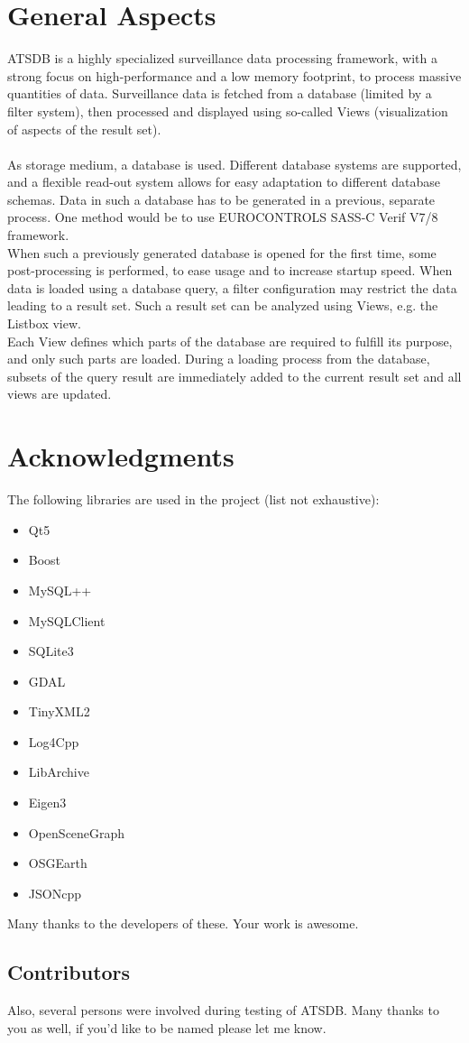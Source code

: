 \section{General Aspects}
ATSDB is a highly specialized surveillance data processing framework, with a strong focus on high-performance and a low memory footprint,  to process massive quantities of data. Surveillance data is fetched from a database (limited by a filter system), then processed and displayed using so-called Views (visualization of aspects of the result set).\\\\

As storage medium, a database is used.  Different database systems are supported, and a flexible read-out system allows for easy adaptation to different database schemas.  Data in such a database has to be generated in a previous, separate process.  One method would be to use EUROCONTROLS SASS-C  Verif V7/8 framework.\\

When such a previously generated database is opened for the first time, some post-processing is performed, to ease usage and to increase startup speed.  When data is loaded using a database query, a filter configuration may restrict the data leading to a result set.  Such a result set can be analyzed using Views, e.g. the Listbox view.\\

Each View defines which parts of the database are required to fulfill its purpose, and only such parts are loaded.  During a loading process from the database, subsets of the query result are immediately added to the current result set and all views are updated. 

\section{Acknowledgments}

The following libraries are used in the project (list not exhaustive):

\begin{itemize}  
\item Qt5
\item Boost
\item MySQL++
\item MySQLClient
\item SQLite3
\item GDAL
\item TinyXML2
\item Log4Cpp
\item LibArchive
\item Eigen3
\item OpenSceneGraph
\item OSGEarth
\item JSONcpp
\end{itemize}

Many thanks to the developers of these. Your work is awesome.

\subsection{Contributors}

Also, several persons were involved during testing of ATSDB. Many thanks to you as well, if you'd like to be named please let me know.


